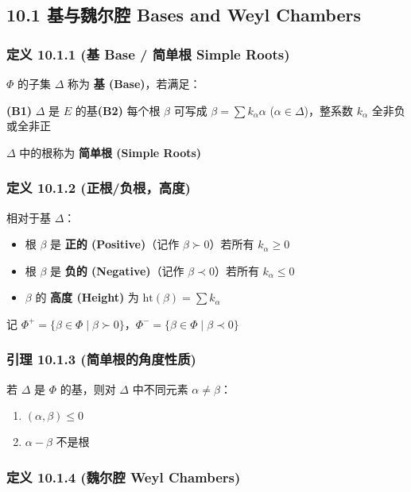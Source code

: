 \subsection{10.1 基与魏尔腔 Bases and Weyl Chambers}

\subsubsection{定义 10.1.1 (基 Base / 简单根 Simple Roots)}

$\Phi$ 的子集 $\Delta$ 称为 \textbf{基 (Base)}，若满足：

\textbf{(B1)} $\Delta$ 是 $E$ 的基\textbf{(B2)} 每个根 $\beta$ 可写成 $\beta = \sum k_\alpha \alpha$ ($\alpha \in \Delta$)，整系数 $k_\alpha$ 全非负或全非正

$\Delta$ 中的根称为 \textbf{简单根 (Simple Roots)}

\subsubsection{定义 10.1.2 (正根/负根，高度)}

相对于基 $\Delta$：

\begin{itemize}
	\item 根 $\beta$ 是 \textbf{正的 (Positive)}（记作 $\beta \succ 0$）若所有 $k_\alpha \geq 0$
	\item 根 $\beta$ 是 \textbf{负的 (Negative)}（记作 $\beta \prec 0$）若所有 $k_\alpha \leq 0$
	\item $\beta$ 的 \textbf{高度 (Height)} 为 $\text{ht}(\beta) = \sum k_\alpha$
\end{itemize}

记 $\Phi^+ = \{\beta \in \Phi \mid \beta \succ 0\}$，$\Phi^- = \{\beta \in \Phi \mid \beta \prec 0\}$

\subsubsection{引理 10.1.3 (简单根的角度性质)}

若 $\Delta$ 是 $\Phi$ 的基，则对 $\Delta$ 中不同元素 $\alpha \neq \beta$：

\begin{enumerate}
	\item $(\alpha, \beta) \leq 0$
	\item $\alpha - \beta$ 不是根
\end{enumerate}

\subsubsection{定义 10.1.4 (魏尔腔 Weyl Chambers)}

